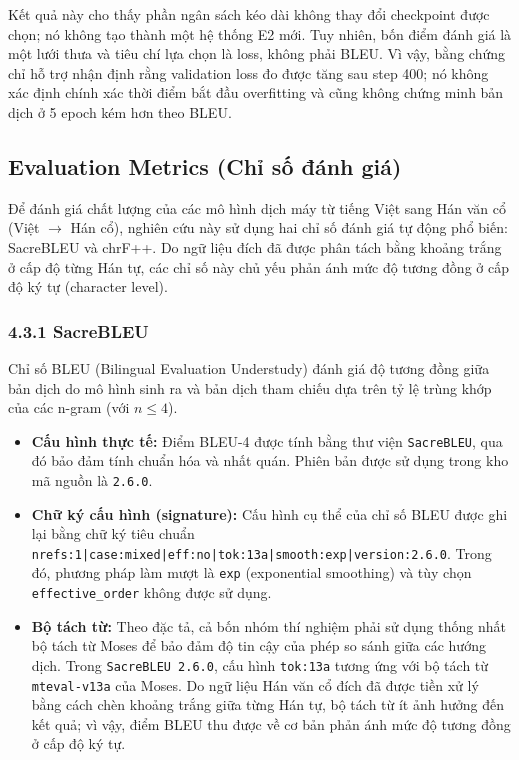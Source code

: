 Kết quả này cho thấy phần ngân sách kéo dài không thay đổi checkpoint được chọn;
nó không tạo thành một hệ thống E2 mới. Tuy nhiên, bốn điểm đánh giá là một lưới
thưa và tiêu chí lựa chọn là loss, không phải BLEU. Vì vậy, bằng chứng chỉ hỗ trợ
nhận định rằng validation loss đo được tăng sau step 400; nó không xác định
chính xác thời điểm bắt đầu overfitting và cũng không chứng minh bản dịch ở 5
epoch kém hơn theo BLEU.





\subsection{Evaluation Metrics (Chỉ số đánh giá)}

Để đánh giá chất lượng của các mô hình dịch máy từ tiếng Việt sang Hán văn cổ (Việt $\rightarrow$ Hán cổ), nghiên cứu này sử dụng hai chỉ số đánh giá tự động phổ biến: SacreBLEU và chrF++. Do ngữ liệu đích đã được phân tách bằng khoảng trắng ở cấp độ từng Hán tự, các chỉ số này chủ yếu phản ánh mức độ tương đồng ở cấp độ ký tự (character level).

\subsubsection{4.3.1 SacreBLEU}
Chỉ số BLEU (Bilingual Evaluation Understudy) đánh giá độ tương đồng giữa bản dịch do mô hình sinh ra và bản dịch tham chiếu dựa trên tỷ lệ trùng khớp của các n-gram (với $n \le 4$).
\begin{itemize}
    \item \textbf{Cấu hình thực tế:} Điểm BLEU-4 được tính bằng thư viện \texttt{SacreBLEU}, qua đó bảo đảm tính chuẩn hóa và nhất quán. Phiên bản được sử dụng trong kho mã nguồn là \texttt{2.6.0}.
    \item \textbf{Chữ ký cấu hình (signature):} Cấu hình cụ thể của chỉ số BLEU được ghi lại bằng chữ ký tiêu chuẩn \texttt{nrefs:1|case:mixed|eff:no|tok:13a|smooth:exp|version:2.6.0}. Trong đó, phương pháp làm mượt là \texttt{exp} (exponential smoothing) và tùy chọn \texttt{effective\_order} không được sử dụng.
    \item \textbf{Bộ tách từ:} Theo đặc tả, cả bốn nhóm thí nghiệm phải sử dụng thống nhất bộ tách từ Moses để bảo đảm độ tin cậy của phép so sánh giữa các hướng dịch. Trong \texttt{SacreBLEU 2.6.0}, cấu hình \texttt{tok:13a} tương ứng với bộ tách từ \texttt{mteval-v13a} của Moses. Do ngữ liệu Hán văn cổ đích đã được tiền xử lý bằng cách chèn khoảng trắng giữa từng Hán tự, bộ tách từ ít ảnh hưởng đến kết quả; vì vậy, điểm BLEU thu được về cơ bản phản ánh mức độ tương đồng ở cấp độ ký tự.
\end{itemize}

